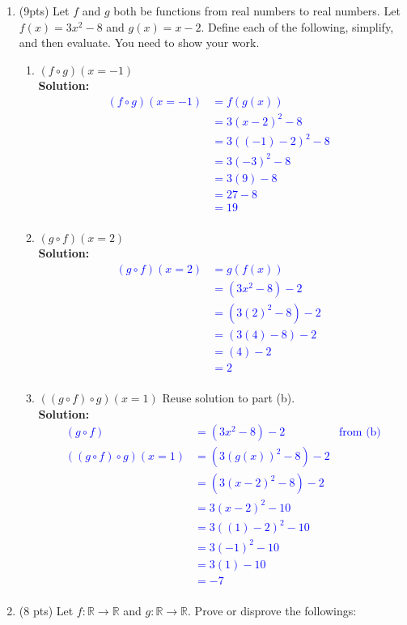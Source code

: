 \documentclass{article}
\newcommand{\sol}[1]{\textbf{Solution:\,}\textcolor{blue}{#1}}
\begin{document}
\begin{enumerate}
\item(9pts) Let $f$ and $g$ both be functions from real numbers to real numbers. Let $f(x) = 3x^2-8$ and $g(x) = x-2$. Define each of the following, simplify, and then evaluate. You need to show your work.
\begin{enumerate}
\item $(f\circ g) (x= -1)$ 
\\\sol{
\begin{align*}
(f\circ g)(x=-1)&=f(g(x))&\text{}\\
&=3(x-2)^2-8&\text{}\\
&=3((-1)-2)^2-8&\text{}\\
&=3(-3)^2-8&\text{}\\
&=3(9)-8&\text{}\\
&=27-8&\text{}\\
&=19&\text{}\\
\end{align*}
}
\item $(g\circ f)(x=2)$
\\\sol{
\begin{align*}
(g\circ f)(x=2)&=g(f(x))&\text{}\\
&=(3x^2-8)-2&\text{}\\
&=(3(2)^2-8)-2&\text{}\\
&=(3(4)-8)-2&\text{}\\
&=(4)-2&\text{}\\
&=2&\text{}\\
\end{align*}
}
\item $((g\circ f)\circ g) (x=1)$ Reuse solution to part (b).
\\\sol{
\begin{align*}
(g\circ f)&=(3x^2-8)-2&\text{from (b)}\\
((g\circ f)\circ g) (x=1)&=(3(g(x))^2-8)-2&\text{}\\
&=(3(x-2)^2-8)-2&\text{}\\
&=3(x-2)^2-10&\text{}\\
&=3((1)-2)^2-10&\text{}\\
&=3(-1)^2-10&\text{}\\
&=3(1)-10&\text{}\\
&=-7&\text{}\\
\end{align*}
}
\end{enumerate}

\newpage

\item (8 pts) Let $f:\mathbb{R} \rightarrow \mathbb{R}$ and $g:\mathbb{R} \rightarrow \mathbb{R}$. Prove or disprove the followings:


\end{enumerate}
\end{document}
